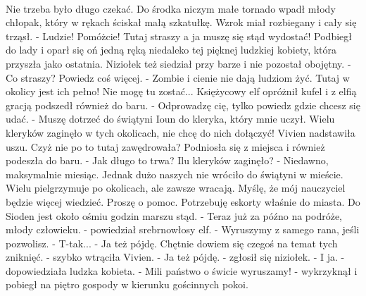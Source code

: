 \documentclass[10pt,twoside,twocolumn]{book}
\begin{document}
\paragraph{}
Nie trzeba było długo czekać. 
Do środka niczym małe tornado wpadł młody chłopak, który w rękach ściskał małą szkatułkę. 
Wzrok miał rozbiegany i cały się trząsł.\newline
\indent - Ludzie! Pomóżcie! Tutaj straszy a ja muszę się stąd wydostać!\newline
Podbiegł do lady i oparł się oń jedną ręką niedaleko tej pięknej ludzkiej kobiety, która przyszła jako ostatnia. 
Niziołek też siedział przy barze i nie pozostał obojętny.\newline
\indent - Co straszy? Powiedz coś więcej.\newline
\indent - Zombie i cienie nie dają ludziom żyć. Tutaj w okolicy jest ich pełno! Nie mogę tu zostać...\newline
Księżycowy elf opróżnił kufel i z elfią gracją podszedł również do baru.
\indent - Odprowadzę cię, tylko powiedz gdzie chcesz się udać.\newline
\indent - Muszę dotrzeć do świątyni Ioun do kleryka, który mnie uczył. Wielu kleryków zaginęło w tych okolicach, nie chcę do nich dołączyć!\newline
Vivien nadstawiła uszu. Czyż nie po to tutaj zawędrowała? Podniosła się z miejsca i również podeszła do baru.
\indent - Jak długo to trwa? Ilu kleryków zaginęło?\newline
\indent - Niedawno, maksymalnie miesiąc. Jednak dużo naszych nie wróciło do świątyni w mieście. Wielu pielgrzymuje po okolicach, ale zawsze wracają. Myślę, że mój nauczyciel będzie więcej wiedzieć. Proszę o pomoc. Potrzebuję eskorty właśnie do miasta. Do Sioden jest około ośmiu godzin marszu stąd.\newline
\indent - Teraz już za późno na podróże, młody człowieku. - powiedział srebrnowłosy elf. - Wyruszymy z samego rana, jeśli pozwolisz.\newline
\indent - T-tak...\newline
\indent - Ja też pójdę. Chętnie dowiem się czegoś na temat tych zniknięć. - szybko wtrąciła Vivien.\newline
\indent - Ja też pójdę. - zgłosił się niziołek.\newline
\indent - I ja. - dopowiedziała ludzka kobieta.\newline
\indent - Mili państwo o świcie wyruszamy! - wykrzyknął i pobiegł na piętro gospody w kierunku gościnnych pokoi.\newline
\end{document}
